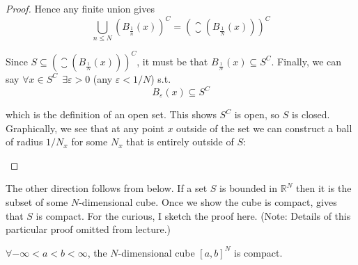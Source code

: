 \documentclass{article}
\begin{document}
\begin{proof}
  Hence any finite union gives
  \[
    \bigcup_{n \le N} \left(B_{\frac{1}{n}}(x)\right)^C =  \left(\closure(B_{\frac{1}{N}}(x))\right)^C
  \]

  Since $S \subseteq \left(\closure(B_{\frac{1}{N}}(x))\right)^C$, it must be that $B_{\frac{1}{N}}(x) \subseteq S^C$. Finally, we can say $\forall x \in S^C ~~ \exists \varepsilon > 0$ (any $\varepsilon < 1/N$) s.t.
  \[
    B_\varepsilon(x) \subseteq S^C
  \]

  which is the definition of an open set. This shows $S^C$ is open, so $S$ is closed. Graphically, we see that at any point $x$ outside of the set we can construct a ball of radius $1 / N_x$ for some $N_x$ that is entirely outside of $S$:
  \begin{figure}[H]
    \centering
  \end{figure}
\end{proof}

The other direction follows from  below. If a set $S$ is bounded in $\mathbb{R}^N$ then it is the subset of some $N$-dimensional cube. Once we show the cube is compact,  gives that $S$ is compact. For the curious, I sketch the proof here. (Note: Details of this particular proof omitted from lecture.)
\begin{theorem}\label{thm:lecture3_compactness_heine_borel_og}
  $\forall -\infty < a < b < \infty$, the $N$-dimensional cube $[a, b]^N$ is compact.
\end{theorem}
\end{document}

